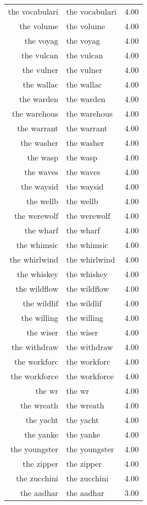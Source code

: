 \begin{table}[ht]
\begin{tabular}{rlr}
  the vocabulari & the vocabulari & 4.00 \\ 
  the volume & the volume & 4.00 \\ 
  the voyag & the voyag & 4.00 \\ 
  the vulcan & the vulcan & 4.00 \\ 
  the vulner & the vulner & 4.00 \\ 
  the wallac & the wallac & 4.00 \\ 
  the warden & the warden & 4.00 \\ 
  the warehous & the warehous & 4.00 \\ 
  the warrant & the warrant & 4.00 \\ 
  the washer & the washer & 4.00 \\ 
  the wasp & the wasp & 4.00 \\ 
  the waves & the waves & 4.00 \\ 
  the waysid & the waysid & 4.00 \\ 
  the wellb & the wellb & 4.00 \\ 
  the werewolf & the werewolf & 4.00 \\ 
  the wharf & the wharf & 4.00 \\ 
  the whimsic & the whimsic & 4.00 \\ 
  the whirlwind & the whirlwind & 4.00 \\ 
  the whiskey & the whiskey & 4.00 \\ 
  the wildflow & the wildflow & 4.00 \\ 
  the wildlif & the wildlif & 4.00 \\ 
  the willing & the willing & 4.00 \\ 
  the wiser & the wiser & 4.00 \\ 
  the withdraw & the withdraw & 4.00 \\ 
  the workforc & the workforc & 4.00 \\ 
  the workforce & the workforce & 4.00 \\ 
  the wr & the wr & 4.00 \\ 
  the wreath & the wreath & 4.00 \\ 
  the yacht & the yacht & 4.00 \\ 
  the yanke & the yanke & 4.00 \\ 
  the youngster & the youngster & 4.00 \\ 
  the zipper & the zipper & 4.00 \\ 
  the zucchini & the zucchini & 4.00 \\ 
  the aadhar & the aadhar & 3.00 \\ 

\end{tabular}
\end{table}
